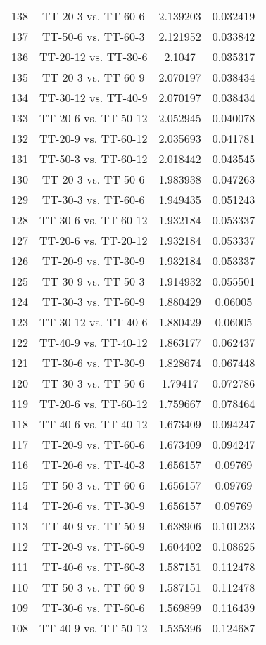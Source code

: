 \documentclass[a4paper,10pt]{article}
\begin{document}
\begin{landscape}
\begin{table}[!htp]
\begin{tabular}{cccc}
138&TT-20-3 vs. TT-60-6&2.139203&0.032419\\
137&TT-50-6 vs. TT-60-3&2.121952&0.033842\\
136&TT-20-12 vs. TT-30-6&2.1047&0.035317\\
135&TT-20-3 vs. TT-60-9&2.070197&0.038434\\
134&TT-30-12 vs. TT-40-9&2.070197&0.038434\\
133&TT-20-6 vs. TT-50-12&2.052945&0.040078\\
132&TT-20-9 vs. TT-60-12&2.035693&0.041781\\
131&TT-50-3 vs. TT-60-12&2.018442&0.043545\\
130&TT-20-3 vs. TT-50-6&1.983938&0.047263\\
129&TT-30-3 vs. TT-60-6&1.949435&0.051243\\
128&TT-30-6 vs. TT-60-12&1.932184&0.053337\\
127&TT-20-6 vs. TT-20-12&1.932184&0.053337\\
126&TT-20-9 vs. TT-30-9&1.932184&0.053337\\
125&TT-30-9 vs. TT-50-3&1.914932&0.055501\\
124&TT-30-3 vs. TT-60-9&1.880429&0.06005\\
123&TT-30-12 vs. TT-40-6&1.880429&0.06005\\
122&TT-40-9 vs. TT-40-12&1.863177&0.062437\\
121&TT-30-6 vs. TT-30-9&1.828674&0.067448\\
120&TT-30-3 vs. TT-50-6&1.79417&0.072786\\
119&TT-20-6 vs. TT-60-12&1.759667&0.078464\\
118&TT-40-6 vs. TT-40-12&1.673409&0.094247\\
117&TT-20-9 vs. TT-60-6&1.673409&0.094247\\
116&TT-20-6 vs. TT-40-3&1.656157&0.09769\\
115&TT-50-3 vs. TT-60-6&1.656157&0.09769\\
114&TT-20-6 vs. TT-30-9&1.656157&0.09769\\
113&TT-40-9 vs. TT-50-9&1.638906&0.101233\\
112&TT-20-9 vs. TT-60-9&1.604402&0.108625\\
111&TT-40-6 vs. TT-60-3&1.587151&0.112478\\
110&TT-50-3 vs. TT-60-9&1.587151&0.112478\\
109&TT-30-6 vs. TT-60-6&1.569899&0.116439\\
108&TT-40-9 vs. TT-50-12&1.535396&0.124687\\

\end{tabular}
\end{table}
\end{landscape}
\end{document}
